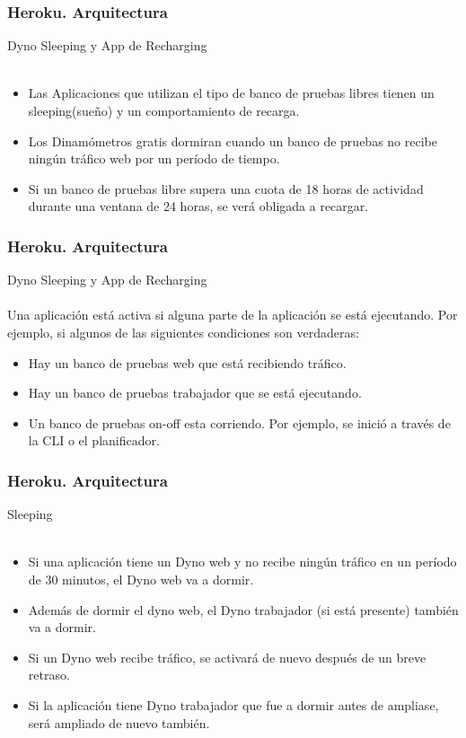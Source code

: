 \documentclass{beamer}
\begin{document}
\begin{frame}
\frametitle{Heroku. Arquitectura}
\centering Dyno Sleeping y App de Recharging\\ \ \\
\begin{itemize}
	\item Las Aplicaciones que utilizan el tipo de banco de pruebas libres tienen un sleeping(sueño) y un comportamiento de recarga.
	\item  Los Dinamómetros gratis dormiran cuando un banco de pruebas no recibe ningún tráfico web por un período de tiempo.
	\item  Si un banco de pruebas libre supera una cuota de 18 horas de actividad durante una ventana de 24 horas, se verá obligada a recargar.
\end{itemize}
\end{frame}

\begin{frame}
\frametitle{Heroku. Arquitectura}
\centering Dyno Sleeping y App de Recharging\\ \ \\
Una aplicación está activa si alguna parte de la aplicación se está ejecutando. Por ejemplo, si algunos de las siguientes condiciones son verdaderas:
\begin{itemize}
\item Hay un banco de pruebas web que está recibiendo tráfico.
\item Hay un banco de pruebas trabajador que se está ejecutando. 
\item Un banco de pruebas on-off esta corriendo. Por ejemplo, se inició a través de la CLI o el planificador.
\end{itemize}
\end{frame}


\begin{frame}
	\frametitle{Heroku. Arquitectura}
	\centering Sleeping\\ \ \\
	\begin{itemize}
		\item Si una aplicación tiene un Dyno web y no recibe ningún tráfico en un período de 30 minutos, el Dyno web va a dormir.
		\item Además de dormir el dyno web, el Dyno trabajador (si está presente) también va a dormir. 
		\item Si un Dyno web recibe tráfico, se activará de nuevo después de un breve retraso. 
		\item Si la aplicación tiene Dyno trabajador que fue a dormir antes de ampliase, será ampliado de nuevo también.
	\end{itemize}
\end{frame}
\end{document}
